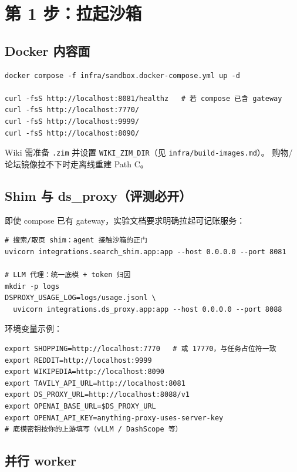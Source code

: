 \documentclass[10.5pt,a4paper]{article}
\begin{document}
\section{第 1 步：拉起沙箱}

\subsection{Docker 内容面}

\begin{lstlisting}
docker compose -f infra/sandbox.docker-compose.yml up -d

curl -fsS http://localhost:8081/healthz   # 若 compose 已含 gateway
curl -fsS http://localhost:7770/
curl -fsS http://localhost:9999/
curl -fsS http://localhost:8090/
\end{lstlisting}

Wiki 需准备 \texttt{.zim} 并设置 \texttt{WIKI\_ZIM\_DIR}（见 \texttt{infra/build-images.md}）。
购物/论坛镜像拉不下时走离线重建 Path C。

\subsection{Shim 与 ds\_proxy（评测必开）}

即使 compose 已有 gateway，实验文档要求明确拉起可记账服务：

\begin{lstlisting}
# 搜索/取页 shim：agent 接触沙箱的正门
uvicorn integrations.search_shim.app:app --host 0.0.0.0 --port 8081

# LLM 代理：统一底模 + token 归因
mkdir -p logs
DSPROXY_USAGE_LOG=logs/usage.jsonl \
  uvicorn integrations.ds_proxy.app:app --host 0.0.0.0 --port 8088
\end{lstlisting}

环境变量示例：
\begin{lstlisting}
export SHOPPING=http://localhost:7770   # 或 17770，与任务占位符一致
export REDDIT=http://localhost:9999
export WIKIPEDIA=http://localhost:8090
export TAVILY_API_URL=http://localhost:8081
export DS_PROXY_URL=http://localhost:8088/v1
export OPENAI_BASE_URL=$DS_PROXY_URL
export OPENAI_API_KEY=anything-proxy-uses-server-key
# 底模密钥按你的上游填写（vLLM / DashScope 等）
\end{lstlisting}

\subsection{并行 worker}
\end{document}
